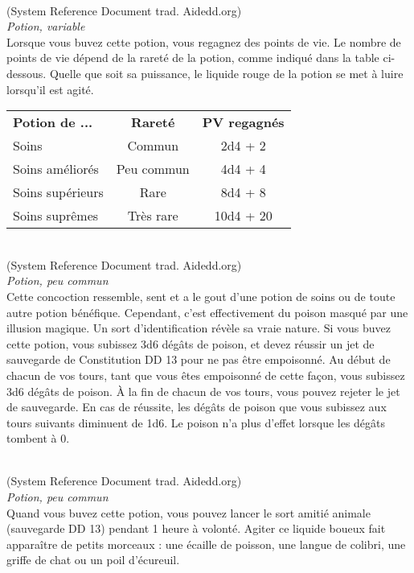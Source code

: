 \\
{\small (System Reference Document trad. Aidedd.org)}\\
{\small \it Potion, variable} \\

Lorsque vous buvez cette potion, vous regagnez des points de vie. Le nombre de points de vie dépend de la rareté de la potion, comme indiqué dans la table ci-dessous. Quelle que soit sa puissance, le liquide rouge de la potion se met à luire lorsqu'il est agité.

\begin{center}
\setlength{\tabcolsep}{4pt}
\begin{tabular}{lcc}
\bf Potion de ... & \bf Rareté & \bf PV regagnés \\
   \rowcolor{LightCyan}
Soins             & Commun     & 2d4 + 2 \\
Soins améliorés   & Peu commun & 4d4 + 4 \\
   \rowcolor{LightCyan}
Soins supérieurs  & Rare       & 8d4 + 8 \\
Soins suprêmes    & Très rare  & 10d4 + 20 \\
\end{tabular}
\end{center}

\\
{\small (System Reference Document trad. Aidedd.org)}\\
{\small \it Potion, peu commun}\\
Cette concoction ressemble, sent et a le gout d'une potion de soins ou de toute autre potion bénéfique. Cependant, c'est effectivement du poison masqué par une illusion magique. Un sort d'identification révèle sa vraie nature.
Si vous buvez cette potion, vous subissez 3d6 dégâts de poison, et devez réussir un jet de sauvegarde de Constitution DD 13 pour ne pas être empoisonné. Au début de chacun de vos tours, tant que vous êtes empoisonné de cette façon, vous subissez 3d6 dégâts de poison. À la fin de chacun de vos tours, vous pouvez rejeter le jet de sauvegarde. En cas de réussite, les dégâts de poison que vous subissez aux tours suivants diminuent de 1d6. Le poison n'a plus d'effet lorsque les dégâts tombent à 0. \\
\pagebreak

\\
{\small (System Reference Document trad. Aidedd.org)}\\
{\small \it Potion, peu commun}\\
Quand vous buvez cette potion, vous pouvez lancer le sort amitié animale (sauvegarde DD 13) pendant 1 heure à volonté. Agiter ce liquide boueux fait apparaître de petits morceaux : une écaille de poisson, une langue de colibri, une griffe de chat ou un poil d'écureuil. \\

